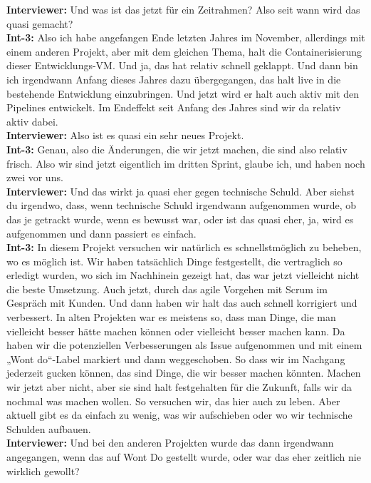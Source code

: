 \textbf{Interviewer:} Und was ist das jetzt für ein Zeitrahmen? Also seit wann wird das quasi gemacht? \\
\textbf{Int-3:} Also ich habe angefangen Ende letzten Jahres im November, allerdings mit einem anderen Projekt, aber mit dem gleichen Thema, halt die Containerisierung dieser Entwicklungs-VM. Und ja, das hat relativ schnell geklappt. Und dann bin ich irgendwann Anfang dieses Jahres dazu übergegangen, das halt live in die bestehende Entwicklung einzubringen. Und jetzt wird er halt auch aktiv mit den Pipelines entwickelt. Im Endeffekt seit Anfang des Jahres sind wir da relativ aktiv dabei. \\
\textbf{Interviewer:} Also ist es quasi ein sehr neues Projekt. \\
\textbf{Int-3:} Genau, also die Änderungen, die wir jetzt machen, die sind also relativ frisch. Also wir sind jetzt eigentlich im dritten Sprint, glaube ich, und haben noch zwei vor uns.\\
\textbf{Interviewer:} Und das wirkt ja quasi eher gegen technische Schuld. Aber siehst du irgendwo, dass, wenn technische Schuld irgendwann aufgenommen wurde, ob das je getrackt wurde, wenn es bewusst war, oder ist das quasi eher, ja, wird es aufgenommen und dann passiert es einfach.\\
\textbf{Int-3:} In diesem Projekt versuchen wir natürlich es schnellstmöglich zu beheben, wo es möglich ist. Wir haben tatsächlich Dinge festgestellt, die vertraglich so erledigt wurden, wo sich im Nachhinein gezeigt hat, das war jetzt vielleicht nicht die beste Umsetzung. Auch jetzt, durch das agile Vorgehen mit Scrum im Gespräch mit Kunden. Und dann haben wir halt das auch schnell korrigiert und verbessert. In alten Projekten war es meistens so, dass man Dinge, die man vielleicht besser hätte machen können oder vielleicht besser machen kann. Da haben wir die potenziellen Verbesserungen als Issue aufgenommen und mit einem „Wont do“-Label markiert und dann weggeschoben. So dass wir im Nachgang jederzeit gucken können, das sind Dinge, die wir besser machen könnten. Machen wir jetzt aber nicht, aber sie sind halt festgehalten für die Zukunft, falls wir da nochmal was machen wollen. So versuchen wir, das hier auch zu leben. Aber aktuell gibt es da einfach zu wenig, was wir aufschieben oder wo wir technische Schulden aufbauen. \\
\textbf{Interviewer:} Und bei den anderen Projekten wurde das dann irgendwann angegangen, wenn das auf Wont Do gestellt wurde, oder war das eher zeitlich nie wirklich gewollt?\\
